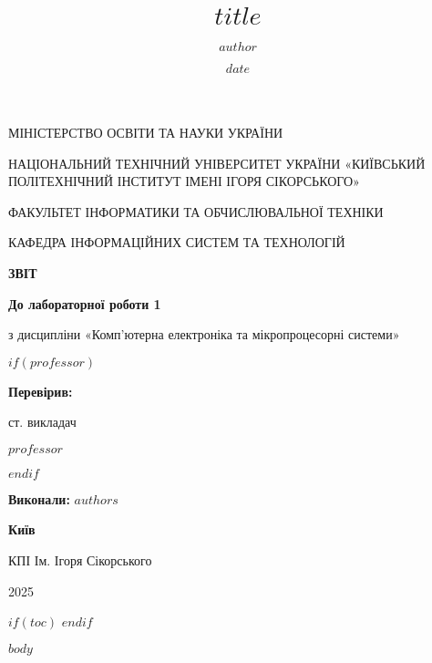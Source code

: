 \documentclass[12pt, a4paper]{article}
\title{$title$}
\author{$author$}
\date{$date$}
\begin{document}
\begin{titlepage}
    \begin{center}
		{\Large
			МІНІСТЕРСТВО ОСВІТИ ТА НАУКИ УКРАЇНИ

			НАЦІОНАЛЬНИЙ ТЕХНІЧНИЙ УНІВЕРСИТЕТ УКРАЇНИ
			«КИЇВСЬКИЙ ПОЛІТЕХНІЧНИЙ ІНСТИТУТ ІМЕНІ ІГОРЯ СІКОРСЬКОГО»

			ФАКУЛЬТЕТ ІНФОРМАТИКИ ТА ОБЧИСЛЮВАЛЬНОЇ ТЕХНІКИ

			КАФЕДРА ІНФОРМАЦІЙНИХ СИСТЕМ ТА ТЕХНОЛОГІЙ
		}


		\vspace{60mm}
		{\large
			\textbf{ЗВІТ}

			\vspace{5mm}

			\textbf{До лабораторної роботи 1}

			\vspace{5mm}

			з дисципліни «Комп'ютерна електроніка та мікропроцесорні системи»
		}

	\end{center}

	\vfill
    $if(professor)$
	\begin{minipage}[t]{0.30\textwidth}
		\textbf{Перевірив:}

		ст. викладач
        
        $professor$
	\end{minipage}
	\hfill
    $endif$
	\begin{minipage}[t]{0.50\textwidth}
		\textbf{Виконали:} $authors$
	\end{minipage}

	\vfill

	\begin{center}
		{\bf
			Київ

			КПІ Ім. Ігоря Сікорського

			2025
		}
	\end{center}
\end{titlepage}

$if(toc)$
    \renewcommand{\contentsname}{Зміст}
    \tableofcontents
    \newpage
$endif$

$body$
\end{document}
